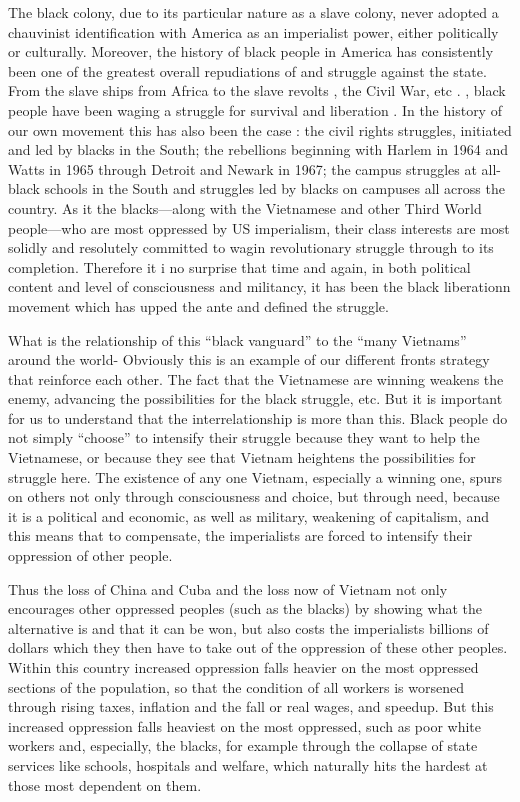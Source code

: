 \documentclass[12pt, titlepage]{article}
\begin{document}
{\begin{spacing}{1.10}
The black colony, due to its particular nature as a slave colony, never adopted a chauvinist identification with America as an imperialist power, either politically or culturally. Moreover, the history of black people in America has consistently been one of the greatest overall repudiations of and struggle against the state. From the slave ships from Africa to the slave revolts , the Civil War, etc . , black people have been waging a struggle for survival and liberation . In the history of our own movement this has also been the case : the civil rights struggles, initiated and led by blacks in the South; the rebellions beginning with Harlem in 1964 and Watts in 1965 through Detroit and Newark in 1967; the campus struggles at all-black schools in the South and struggles led by blacks on campuses all across the country. As it the blacks—along with the Vietnamese and other Third World people—who are most oppressed by US imperialism, their class interests are most solidly and resolutely committed to wagin revolutionary struggle through to its completion. Therefore it i no surprise that time and again, in both political content and level of consciousness and militancy, it has been the black liberationn movement which has upped the ante and defined the struggle.

What is the relationship of this ``black vanguard'' to the ``many Vietnams'' around the world- Obviously this is an example of our different fronts strategy that reinforce each other. The fact that the Vietnamese are winning weakens the enemy, advancing the possibilities for the black struggle, etc. But it is important for us to understand that the interrelationship is more than this. Black people do not simply ``choose'' to intensify their struggle because they want to help the Vietnamese, or because they see that Vietnam heightens the possibilities for struggle here. The existence of any one Vietnam, especially a winning one, spurs on others not only through consciousness and choice, but through need, because it is a political and economic, as well as military, weakening of capitalism, and this means that to compensate, the imperialists are forced to intensify their oppression of other people.

Thus the loss of China and Cuba and the loss now of Vietnam not only encourages other oppressed peoples (such as the blacks) by showing what the alternative is and that it can be won, but also costs the imperialists billions of dollars which they then have to take out of the oppression of these other peoples. Within this country increased oppression falls heavier on the most oppressed sections of the population, so that the condition of all workers is worsened through rising taxes, inflation and the fall or real wages, and speedup. But this increased oppression falls heaviest on the most oppressed, such as poor white workers and, especially, the blacks, for example through the collapse of state services like schools, hospitals and welfare, which naturally hits the hardest at those most dependent on them.


\end{spacing}}
\end{document}
